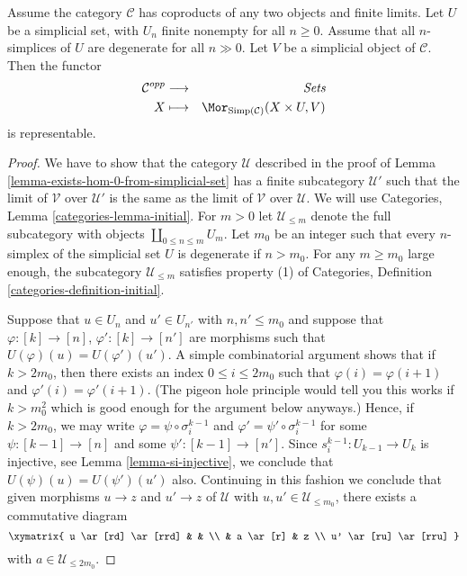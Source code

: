 \begin{lemma}
\label{lemma-exists-hom-0-from-simplicial-set-finite}
Assume the category $\mathcal{C}$
has coproducts of any two objects and finite
limits. Let $U$ be a simplicial set, with $U_n$ finite nonempty
for all $n \geq 0$. Assume that all $n$-simplices
of $U$ are degenerate for all $n \gg 0$.
Let $V$ be a simplicial object of $\mathcal{C}$.
Then the functor
\begin{eqnarray*}
\mathcal{C}^{opp} & \longrightarrow & \textit{Sets} \\
X
& \longmapsto &
\Mor_{\text{Simp}(\mathcal{C})}(X \times U, V)
\end{eqnarray*}
is representable.
\end{lemma}

\begin{proof}
We have to show that the category $\mathcal{U}$ described
in the proof of Lemma \ref{lemma-exists-hom-0-from-simplicial-set}
has a finite subcategory $\mathcal{U}'$ such that the limit
of $\mathcal{V}$ over $\mathcal{U}'$ is the same as the
limit of $\mathcal{V}$ over $\mathcal{U}$. We will use
Categories, Lemma \ref{categories-lemma-initial}.
For $m > 0$ let $\mathcal{U}_{\leq m}$ denote the full
subcategory with objects $\coprod_{0 \leq n \leq m} U_m$.
Let $m_0$ be an integer such that every $n$-simplex
of the simplicial set $U$ is degenerate if $n > m_0$.
For any $m \geq m_0$ large enough, the subcategory
$\mathcal{U}_{\leq m}$ satisfies property (1) of
Categories, Definition \ref{categories-definition-initial}.

\medskip\noindent
Suppose that $u \in U_n$ and
$u' \in U_{n'}$ with $n, n' \leq m_0$ and suppose that
$\varphi : [k] \to [n]$, $\varphi' : [k] \to [n']$
are morphisms such that $U(\varphi)(u) = U(\varphi')(u')$.
A simple combinatorial argument shows that if $k > 2m_0$,
then there exists an index $0 \leq i \leq 2m_0$ such that
$\varphi(i) =\varphi(i + 1)$ and $\varphi'(i) = \varphi'(i + 1)$.
(The pigeon hole principle would tell you this works if
$k > m_0^2$ which is good enough for the argument below
anyways.) Hence, if $k > 2m_0$, we may write
$\varphi = \psi \circ \sigma^{k - 1}_i$ and
$\varphi' = \psi' \circ \sigma^{k - 1}_i$ for some
$\psi : [k - 1] \to [n]$ and some $\psi' : [k - 1] \to [n']$.
Since $s^{k - 1}_i : U_{k - 1} \to U_k$ is injective,
see Lemma \ref{lemma-si-injective}, we conclude that
$U(\psi)(u) = U(\psi')(u')$ also. Continuing in this
fashion we conclude that given morphisms
$u \to z$ and $u' \to z$ of $\mathcal{U}$
with $u, u' \in \mathcal{U}_{\leq m_0}$, there exists
a commutative diagram
$$
\xymatrix{
u \ar[rd] \ar[rrd] & & \\
& a \ar[r] & z \\
u' \ar[ru] \ar[rru]
}
$$
with $a \in \mathcal{U}_{\leq 2m_0}$.


\end{proof}
